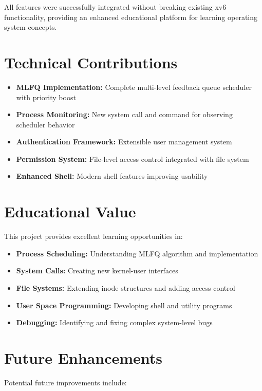\documentclass[a4paper,12pt]{report}
\begin{document}
All features were successfully integrated without breaking existing xv6 functionality, providing an enhanced educational platform for learning operating system concepts.

\section{Technical Contributions}

\begin{itemize}
    \item \textbf{MLFQ Implementation:} Complete multi-level feedback queue scheduler with priority boost
    \item \textbf{Process Monitoring:} New system call and command for observing scheduler behavior
    \item \textbf{Authentication Framework:} Extensible user management system
    \item \textbf{Permission System:} File-level access control integrated with file system
    \item \textbf{Enhanced Shell:} Modern shell features improving usability
\end{itemize}

\section{Educational Value}

This project provides excellent learning opportunities in:

\begin{itemize}
    \item \textbf{Process Scheduling:} Understanding MLFQ algorithm and implementation
    \item \textbf{System Calls:} Creating new kernel-user interfaces
    \item \textbf{File Systems:} Extending inode structures and adding access control
    \item \textbf{User Space Programming:} Developing shell and utility programs
    \item \textbf{Debugging:} Identifying and fixing complex system-level bugs
\end{itemize}

\section{Future Enhancements}

Potential future improvements include:
\end{document}
